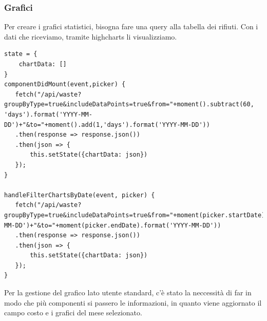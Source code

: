\documentclass{report}
\begin{document}
\subsubsection{Grafici}
Per creare i grafici statistici, bisogna fare una query alla tabella dei rifiuti. Con i dati che riceviamo, tramite
highcharts li visualizziamo.
\begin{lstlisting}
state = {
	chartData: []
}
componentDidMount(event,picker) {
   fetch("/api/waste?groupByType=true&includeDataPoints=true&from="+moment().subtract(60, 'days').format('YYYY-MM-DD')+"&to="+moment().add(1,'days').format('YYYY-MM-DD'))
   .then(response => response.json())
   .then(json => {
	   this.setState({chartData: json})
   });
}

handleFilterChartsByDate(event, picker) {
   fetch("/api/waste?groupByType=true&includeDataPoints=true&from="+moment(picker.startDate).format('YYYY-MM-DD')+"&to="+moment(picker.endDate).format('YYYY-MM-DD'))
   .then(response => response.json())
   .then(json => {
	   this.setState({chartData: json})
   });
}
\end{lstlisting}
Per la gestione del grafico lato utente standard, c'è stato la neccessità di far in modo che più componenti si passero le informazioni,
in quanto viene aggiornato il campo costo e i grafici del mese selezionato.
\end{document}
